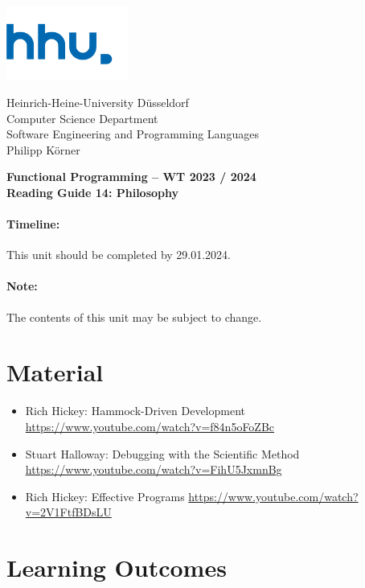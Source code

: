 \documentclass[11pt,a4paper]{article}
\begin{document}
\begin{minipage}[b]{\textwidth}
	\parbox[t]{5cm}{%
		\includegraphics[width=4cm]{unilogo}
		\hfill
	}
	\parbox[b]{11cm}{%
		Heinrich-Heine-University D\"usseldorf\\
		Computer Science Department\\
		Software Engineering and Programming Languages\\
		Philipp K\"orner
	}
\end{minipage}
\begin{center}
	\bf
	Functional Programming -- WT 2023 / 2024\\
	Reading Guide 14: Philosophy
\end{center}

\pagestyle{empty}

\paragraph{Timeline:} This unit should be completed by 29.01.2024.

\paragraph{Note:} The contents of this unit may be subject to change.

\section{Material} 

\begin{itemize}
\item Rich Hickey: Hammock-Driven Development \url{https://www.youtube.com/watch?v=f84n5oFoZBc}
\item Stuart Halloway: Debugging with the Scientific Method \url{https://www.youtube.com/watch?v=FihU5JxmnBg}
\item Rich Hickey: Effective Programs \url{https://www.youtube.com/watch?v=2V1FtfBDsLU}
\end{itemize}


\section{Learning Outcomes}
\end{document}
